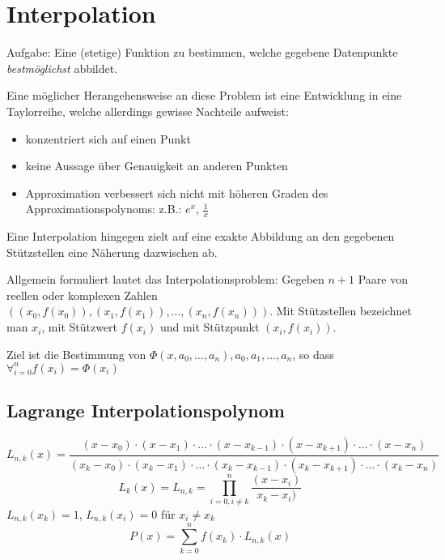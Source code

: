  \chapter{Interpolation}
Aufgabe: Eine (stetige) Funktion zu bestimmen, welche gegebene Datenpunkte \textit{bestmöglichst} abbildet.

Eine möglicher Herangehensweise an diese Problem ist eine Entwicklung in eine Taylorreihe, welche allerdings gewisse Nachteile aufweist:
\begin{itemize}
	\item konzentriert sich auf einen Punkt
	\item keine Aussage über Genauigkeit an anderen Punkten
	\item Approximation verbessert sich nicht mit höheren Graden des Approximationspolynoms: z.B.: $e^x$, $\frac{1}{x}$
\end{itemize}
		
Eine Interpolation hingegen zielt auf eine exakte Abbildung an den gegebenen Stützstellen eine Näherung dazwischen ab.

Allgemein formuliert lautet das Interpolationsproblem: Gegeben $n + 1$ Paare von reellen oder komplexen Zahlen $\left( (x_0, f(x_0)), (x_1, f(x_1)), \ldots , (x_n, f(x_n)) \right)$. Mit Stützstellen bezeichnet man $x_i$, mit Stützwert $f(x_i)$ und mit Stützpunkt $(x_i, f(x_i))$.

Ziel ist die Bestimmung von $\Phi(x, a_0, \ldots, a_n), a_0, a_1, \ldots, a_n$, so dass $\forall_{i = 0}^n f(x_i) = \Phi(x_i)$

\section{Lagrange Interpolationspolynom}
\begin{equation}
	L_{n, k} (x) = \frac{(x - x_0) \cdot (x - x_1) \cdot \ldots \cdot (x - x_{k-1}) \cdot (x - x_{k + 1}) \cdot \ldots \cdot (x - x_n)}{(x_k - x_0) \cdot (x_k - x_1) \cdot \ldots \cdot (x_k - x_{k - 1}) \cdot (x_k - x_{k + 1}) \cdot \ldots \cdot (x_k - x_n)}
\end{equation}
\begin{equation}
	L_k(x) = L_{n, k} = \prod_{i = 0, i \ne k}^n \frac{(x - x_i)}{x_k - x_i)}
\end{equation}
$L_{n, k}(x_k) = 1$, $L_{n, k}(x_i) = 0$ für $x_i \ne x_k$
\begin{equation}
	P(x) = \sum_{k = 0}^n f(x_k) \cdot L_{n, k}(x)
\end{equation}

